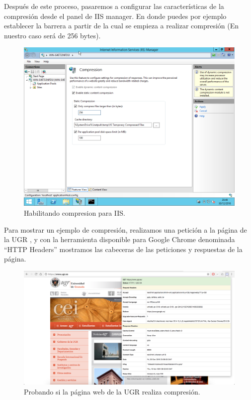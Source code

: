 Después de este proceso, pasaremos a configurar las características de la compresión desde el panel de IIS manager. En donde puedes por ejemplo establecer la barrera a partir de la cual se empieza a realizar compresión (En nuestro caso será de 256 bytes).

\begin{figure}[H]
	\begin{center}
		\includegraphics[width=15cm]{Imagenes/Configuracion_compresion}
		\caption{Habilitando compresion para IIS.}
		\label{fig:24}
	\end{center}
\end{figure}

Para mostrar un ejemplo de compresión, realizamos una petición a la página de la UGR \cite{UGR}, y con la herramienta disponible para Google Chrome denominada ``HTTP Headers'' mostramos las cabeceras de las peticiones y respuestas de la página.

\begin{figure}[H]
	\begin{center}
		\includegraphics[width=15cm]{Imagenes/Probando_compresion}
		\caption{Probando si la página web de la UGR realiza compresión.}
		\label{fig:25}
	\end{center}
\end{figure}

